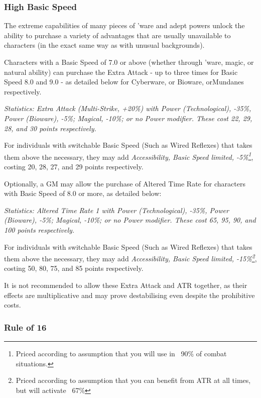 \begin{multicols*}{3}
	\subsubsection{High Basic Speed}\label{high_basic_speed}
	
	The extreme capabilities of many pieces of 'ware and adept powers unlock the ability to purchase a variety of advantages that are usually unavailable to characters (in the exact same way as with unusual backgrounds).
	
	Characters with a Basic Speed of 7.0 or above (whether through 'ware, magic, or natural ability) can purchase the Extra Attack - up to three times for Basic Speed 8.0 and 9.0 - as detailed below for Cyberware, or Bioware, orMundanes respectively.
	
	\textit{\textcolor{OliveGreen}{Statistics: Extra Attack (Multi-Strike, +20\%) with Power (Technological), -35\%, Power (Bioware), -5\%; Magical, -10\%; or no Power modifier. These cost 22, 29, 28, and 30 points respectively.}}
	
	For individuals with switchable Basic Speed (Such as Wired Reflexes) that takes them above the necessary, they may add \textit{Accessibility, Basic Speed limited, -5\%\footnote{Priced according to assumption that you will use in ~90\% of combat situations.}}, costing 20, 28, 27, and 29 points respectively.
	
	Optionally, a GM may allow the purchase of Altered Time Rate for characters with Basic Speed of 8.0 or more, as detailed below:
	
	\textit{\textcolor{OliveGreen}{Statistics: Altered Time Rate 1 with Power (Technological), -35\%, Power (Bioware), -5\%; Magical, -10\%; or no Power modifier. These cost 65, 95, 90, and 100 points respectively.}}
	
	For individuals with switchable Basic Speed (Such as Wired Reflexes) that takes them above the necessary, they may add \textit{Accessibility, Basic Speed limited, -15\%\footnote{Priced according to assumption that you can benefit from ATR at all times, but will activate ~67\%}}, costing 50, 80, 75, and 85 points respectively. 
	
	It is not recommended to allow these Extra Attack and ATR together, as their effects are multiplicative and may prove destabilising even despite the prohibitive costs.
	
	\subsubsection{Rule of 16}
	

\end{multicols*}
